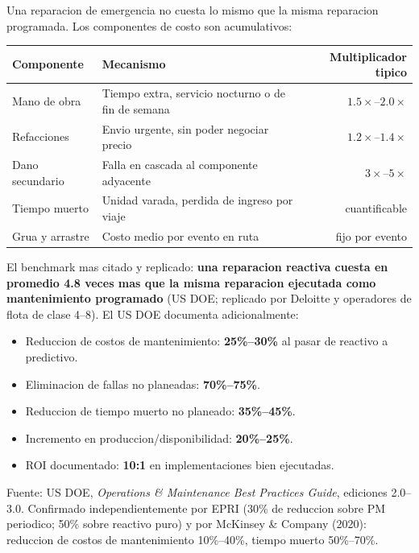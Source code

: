 \documentclass[10.5pt,a4paper]{article}
\begin{document}
Una reparacion de emergencia no cuesta lo mismo que la misma reparacion programada.
Los componentes de costo son acumulativos:

\begin{center}
\small
\begin{tabular}{@{}p{4.8cm}p{5.8cm}r@{}}
\toprule
\textbf{Componente} & \textbf{Mecanismo} & \textbf{Multiplicador tipico} \\
\midrule
Mano de obra & Tiempo extra, servicio nocturno o de fin de semana & $1.5\times$--$2.0\times$ \\
Refacciones & Envio urgente, sin poder negociar precio & $1.2\times$--$1.4\times$ \\
Dano secundario & Falla en cascada al componente adyacente & $3\times$--$5\times$ \\
Tiempo muerto & Unidad varada, perdida de ingreso por viaje & cuantificable \\
Grua y arrastre & Costo medio por evento en ruta & fijo por evento \\
\bottomrule
\end{tabular}
\end{center}

\medskip
El benchmark mas citado y replicado: \textbf{una reparacion reactiva cuesta en
promedio 4.8 veces mas que la misma reparacion ejecutada como mantenimiento
programado} (US DOE; replicado por Deloitte y operadores de flota de clase 4--8).
El US DOE documenta adicionalmente:

\begin{redbox}
\begin{itemize}
  \item Reduccion de costos de mantenimiento: \textbf{25\%--30\%} al pasar de reactivo a predictivo.
  \item Eliminacion de fallas no planeadas: \textbf{70\%--75\%}.
  \item Reduccion de tiempo muerto no planeado: \textbf{35\%--45\%}.
  \item Incremento en produccion/disponibilidad: \textbf{20\%--25\%}.
  \item ROI documentado: \textbf{10:1} en implementaciones bien ejecutadas.
\end{itemize}
\vspace{2pt}
{\small\color{muted} Fuente: US DOE, \textit{Operations \& Maintenance Best Practices Guide}, ediciones 2.0--3.0.
Confirmado independientemente por EPRI (30\% de reduccion sobre PM periodico;
50\% sobre reactivo puro) y por McKinsey \& Company (2020): reduccion
de costos de mantenimiento 10\%--40\%, tiempo muerto 50\%--70\%.}
\end{redbox}
\end{document}
